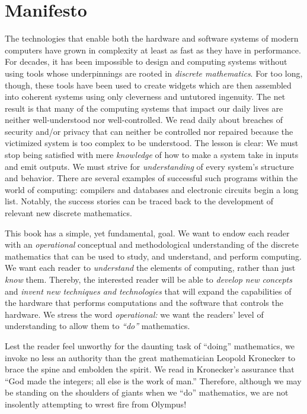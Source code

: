 
\chapter*{Manifesto}

The technologies that enable both the hardware and software systems of
modern computers have grown in complexity at least as fast as they
have in performance.  For decades, it has been impossible to design
and computing systems without using tools whose underpinnings are
rooted in {\it discrete mathematics}.  For too long, though, these
tools have been used to create widgets which are then assembled into
coherent systems using only cleverness and untutored ingenuity.  The
net result is that many of the computing systems that impact our daily
lives are neither well-understood nor well-controlled.  We read daily
about breaches of security and/or privacy that can neither be
controlled nor repaired because the victimized system is too complex
to be understood.  The lesson is clear: We must stop being satisfied
with mere {\em knowledge} of how to make a system take in inputs and
emit outputs.  We must strive for {\em understanding} of every
system's structure and behavior.  There are several examples of
successful such programs within the world of computing: compilers and
databases and electronic circuits begin a long list.  Notably, the
success stories can be traced back to the development of relevant new
discrete mathematics.

This book has a simple, yet fundamental, goal.  We want to endow each
reader with an {\em operational} conceptual and methodological
understanding of the discrete mathematics that can be used to study,
and understand, and perform computing.  We want each reader to {\em
  understand} the elements of computing, rather than just {\em know}
them.  Thereby, the interested reader will be able to {\em develop new
  concepts} and {\em invent new techniques and technologies} that will
expand the capabilities of the hardware that performs computations and
the software that controls the hardware.  We stress the word {\it
  operational:} we want the readers' level of understanding to allow
them to {\em ``do''} mathematics.

\bigskip

Lest the reader feel unworthy for the daunting task of ``doing''
mathematics, we invoke no less an authority than the great
mathematician Leopold Kronecker to brace
the spine and embolden the spirit.  We read in \cite{Bell86}
Kronecker's assurance that ``God made the integers; all else is the
work of man.''  Therefore, although we may be standing on the
shoulders of giants when we ``do'' mathematics, we are not insolently
attempting to wrest fire from Olympus!

